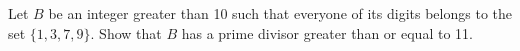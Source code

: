 Let $B$ be an integer greater than 10 such that everyone of its digits belongs to the set $\{1,3,7,9\}$. Show that $B$ has a prime divisor  greater than or equal to 11.